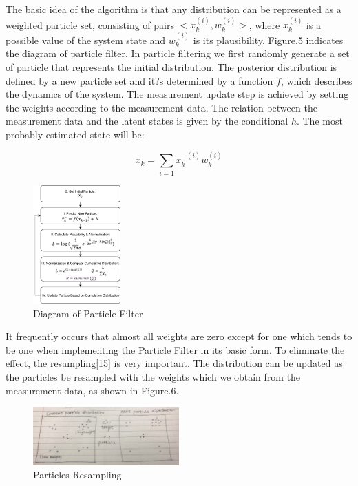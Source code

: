 \documentclass[10pt,twocolumn,letterpaper]{article}
\begin{document}
The basic idea of the algorithm is that any distribution can be represented as a weighted particle set, consisting of pairs $<x_k^{(i)}, w_k^{(i)}>$, where $x_k^{(i)}$ is a possible value of the system state and $w_k^{(i)}$ is its plausibility. Figure.5 indicates the diagram of particle filter. In particle filtering we first randomly generate a set of particle that represents the initial distribution. The posterior distribution is defined by a new particle set and it?s determined by a function $f$, which describes the dynamics of the system. The measurement update step is achieved by setting the weights according to the measurement data. The relation between the measurement data and the latent states is given by the conditional $h$. The most probably estimated state will be:

\begin{equation}
x_k=\sum_{i=1}x_k^{-(i)}w_k^{(i)}
\end{equation}

\begin{figure}
     \centering
       \includegraphics[width=0.3\textwidth]{pic_5.png}
        \caption{\small{Diagram of Particle Filter}}
 \end{figure}

It frequently occurs that almost all weights are zero except for one which tends to be one when implementing the Particle Filter in its basic form. To eliminate the effect, the resampling[15] is very important. The distribution can be updated as the particles be resampled with the weights which we obtain from the measurement data, as shown in Figure.6.

\begin{figure}
     \centering
       \includegraphics[width=0.5\textwidth]{pic_6.png}
        \caption{\small{Particles Resampling}}
 \end{figure}
\end{document}
